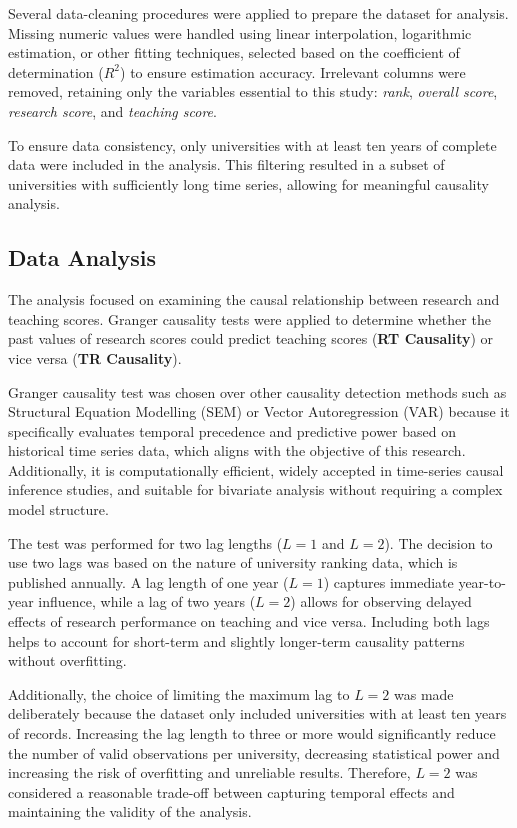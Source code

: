 \documentclass[conference]{IEEEtran}
\begin{document}
Several data-cleaning procedures were applied to prepare the dataset for analysis. Missing numeric values were handled using linear interpolation, logarithmic estimation, or other fitting techniques, selected based on the coefficient of determination ($R^{2}$) to ensure estimation accuracy. Irrelevant columns were removed, retaining only the variables essential to this study: \textit{rank}, \textit{overall score}, \textit{research score}, and \textit{teaching score}.

To ensure data consistency, only universities with at least ten years of complete data were included in the analysis. This filtering resulted in a subset of universities with sufficiently long time series, allowing for meaningful causality analysis.

\subsection{Data Analysis}

The analysis focused on examining the causal relationship between research and teaching scores.  Granger causality tests \cite{granger1969investigating} were applied to determine whether the past values of research scores could predict teaching scores (\textbf{RT Causality}) or vice versa (\textbf{TR Causality}).

Granger causality test was chosen over other causality detection methods such as Structural Equation Modelling (SEM) or Vector Autoregression (VAR) because it specifically evaluates temporal precedence and predictive power based on historical time series data, which aligns with the objective of this research. Additionally, it is computationally efficient, widely accepted in time-series causal inference studies, and suitable for bivariate analysis without requiring a complex model structure.

The test was performed for two lag lengths ($L=1$ and $L=2$). The decision to use two lags was based on the nature of university ranking data, which is published annually. A lag length of one year ($L=1$) captures immediate year-to-year influence, while a lag of two years ($L=2$) allows for observing delayed effects of research performance on teaching and vice versa. Including both lags helps to account for short-term and slightly longer-term causality patterns without overfitting.

Additionally, the choice of limiting the maximum lag to $L=2$ was made deliberately because the dataset only included universities with at least ten years of records. Increasing the lag length to three or more would significantly reduce the number of valid observations per university, decreasing statistical power and increasing the risk of overfitting and unreliable results. Therefore, $L=2$ was considered a reasonable trade-off between capturing temporal effects and maintaining the validity of the analysis.
\end{document}
